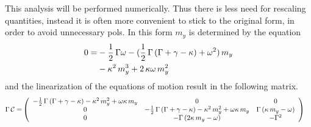 This analysis will be performed numerically. Thus there is less need for rescaling quantities, instead it is often more convenient to stick to the original form, in order to avoid unnecessary pols. In this form $m_y$ is determined by the equation
\begin{align*}
    0=&-\frac{1}{2}\,\Gamma\omega-(\frac{1}{2}\,\Gamma\,(\Gamma+\gamma-\kappa)+\omega^2)\,m_y\\&-\kappa^2\,m_y^3+2\,\kappa\omega\,m_y^2
\end{align*}
and the linearization of the equations of motion result in the following matrix.
\begin{align*}
    \Gamma\,\mathcal{C}=&\left( \begin{array}{c c c}
        -\frac{1}{2}\,\Gamma\,(\Gamma+\gamma-\kappa)-\kappa^2\,m_y^2
        +\omega\kappa\,m_y&0&0\\
        0&-\frac{1}{2}\,\Gamma\,(\Gamma+\gamma-\kappa)-\kappa^2\,m_y^2
        +\omega\kappa\,m_y&\Gamma\,(\kappa\,m_y-\omega)\\
        0&-\Gamma\,(2\kappa\,m_y-\omega)&-\Gamma^2
    \end{array}  \right)
\end{align*}



